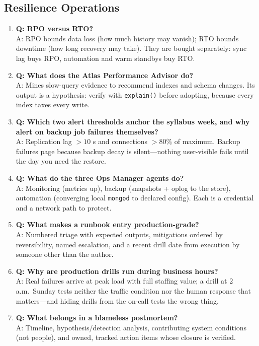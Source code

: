\subsection{Resilience Operations}
\begin{enumerate}
    \item \textbf{Q: RPO versus RTO?}\\
    A: RPO bounds data loss (how much history may vanish); RTO bounds downtime (how long recovery may take). They are bought separately: sync lag buys RPO, automation and warm standbys buy RTO.

    \item \textbf{Q: What does the Atlas Performance Advisor do?}\\
    A: Mines slow-query evidence to recommend indexes and schema changes. Its output is a hypothesis: verify with \texttt{explain()} before adopting, because every index taxes every write.

    \item \textbf{Q: Which two alert thresholds anchor the syllabus week, and why alert on backup job failures themselves?}\\
    A: Replication lag $>10$ s and connections $>80\%$ of maximum. Backup failures page because backup decay is silent---nothing user-visible fails until the day you need the restore.

    \item \textbf{Q: What do the three Ops Manager agents do?}\\
    A: Monitoring (metrics up), backup (snapshots + oplog to the store), automation (converging local \texttt{mongod} to declared config). Each is a credential and a network path to protect.

    \item \textbf{Q: What makes a runbook entry production-grade?}\\
    A: Numbered triage with expected outputs, mitigations ordered by reversibility, named escalation, and a recent drill date from execution by someone other than the author.

    \item \textbf{Q: Why are production drills run during business hours?}\\
    A: Real failures arrive at peak load with full staffing value; a drill at 2 a.m.\ Sunday tests neither the traffic condition nor the human response that matters---and hiding drills from the on-call tests the wrong thing.

    \item \textbf{Q: What belongs in a blameless postmortem?}\\
    A: Timeline, hypothesis/detection analysis, contributing system conditions (not people), and owned, tracked action items whose closure is verified.
\end{enumerate}

